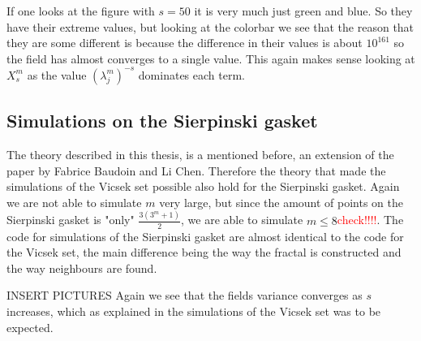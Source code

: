 If one looks at the figure with $s = 50$ it is very much just green and blue. So they have their extreme values, but looking at the colorbar we see that the reason that they are some different is because the difference in their values is about $10^{161}$ so the field has almost converges to a single value. This again makes sense looking at $X_s^{m}$ as the value $(\lambda_j^{m})^{-s}$ dominates each term.

\subsection*{Simulations on the Sierpinski gasket}
The theory described in this thesis, is a mentioned before, an extension of the paper \cite{Fabrice} by Fabrice Baudoin and Li Chen. Therefore the theory that made the simulations of the Vicsek set possible also hold for the Sierpinski gasket. Again we are not able to simulate $m$ very large, but since the amount of points on the Sierpinski gasket is "only" $\frac{3(3^{m} +1 )}{2}$, we are able to simulate $m \leq 8$\textcolor{red}{check!!!!}. The code for  simulations of the Sierpinski gasket are almost identical to the code for the Vicsek set, the main difference being the way the fractal is constructed and the way neighbours are found.  

{\huge INSERT PICTURES}
Again we see that the fields variance converges as $s$ increases, which as explained in the simulations of the Vicsek set was to be expected. 
